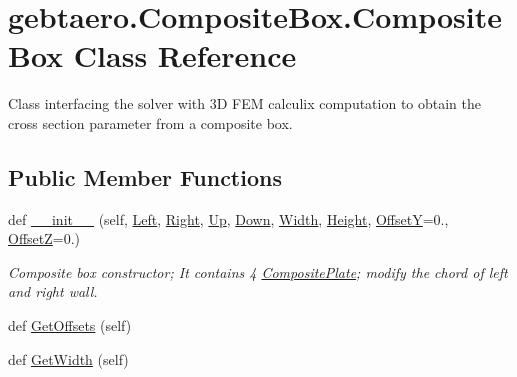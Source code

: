 \hypertarget{classgebtaero_1_1_composite_box_1_1_composite_box}{}\section{gebtaero.\+Composite\+Box.\+Composite\+Box Class Reference}
\label{classgebtaero_1_1_composite_box_1_1_composite_box}


Class interfacing the solver with 3D F\+EM calculix computation to obtain the cross section parameter from a composite box.  


\subsection*{Public Member Functions}
\begin{DoxyCompactItemize}
\item 
def \hyperlink{classgebtaero_1_1_composite_box_1_1_composite_box_a64c4292dbd036313813fc00a78fb13cb}{\+\_\+\+\_\+init\+\_\+\+\_\+} (self, \hyperlink{classgebtaero_1_1_composite_box_1_1_composite_box_a7bfe2dab84e5ae8d8cdba1337b89c309}{Left}, \hyperlink{classgebtaero_1_1_composite_box_1_1_composite_box_a61cdca93cc1f5ef451192395fc50b67b}{Right}, \hyperlink{classgebtaero_1_1_composite_box_1_1_composite_box_a4c043150a29d71b986a91f21be6a4e47}{Up}, \hyperlink{classgebtaero_1_1_composite_box_1_1_composite_box_ad1559917cabe3fcb6c05bf603d8b0b0c}{Down}, \hyperlink{classgebtaero_1_1_composite_box_1_1_composite_box_a44593d7302ceb1c46ac637437b5e1061}{Width}, \hyperlink{classgebtaero_1_1_composite_box_1_1_composite_box_affc2b38183c3b0ec7534629cf63e4cc5}{Height}, \hyperlink{classgebtaero_1_1_composite_box_1_1_composite_box_a26fcf7763030afb28f45f2354125c352}{OffsetY}=0., \hyperlink{classgebtaero_1_1_composite_box_1_1_composite_box_a50e38078e66133a95f34f2d9176329d9}{OffsetZ}=0.)
\begin{DoxyCompactList}\small\item\em Composite box constructor; It contains 4 \hyperlink{namespacegebtaero_1_1_composite_plate}{Composite\+Plate}; modify the chord of left and right wall. \end{DoxyCompactList}\item 
def \hyperlink{classgebtaero_1_1_composite_box_1_1_composite_box_a80477ea79acc12d0d45970d6c0b208d6}{Get\+Offsets} (self)
\item 
def \hyperlink{classgebtaero_1_1_composite_box_1_1_composite_box_a227089b18b5436fdba7853cbe1071a99}{Get\+Width} (self)

\end{DoxyCompactItemize}
